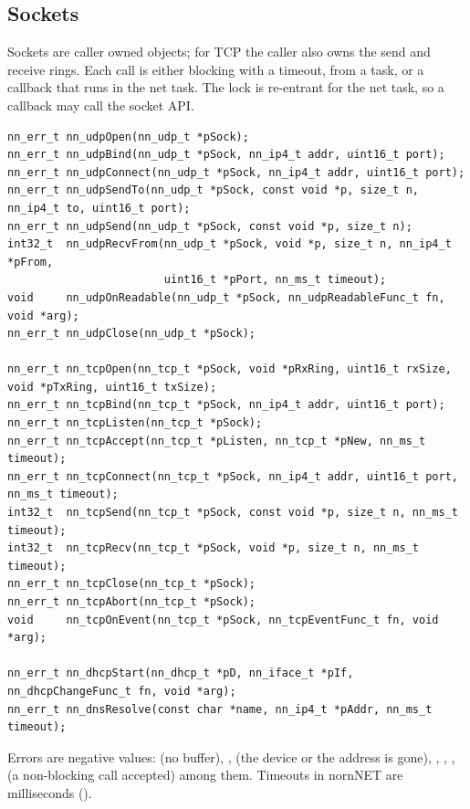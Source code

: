 \subsection{Sockets}

Sockets are caller owned objects; for TCP the caller also owns the send and receive
rings. Each call is either blocking with a timeout, from a task, or a callback that runs
in the net task. The lock is re-entrant for the net task, so a callback may call the
socket API.

\begin{lstlisting}
nn_err_t nn_udpOpen(nn_udp_t *pSock);
nn_err_t nn_udpBind(nn_udp_t *pSock, nn_ip4_t addr, uint16_t port);
nn_err_t nn_udpConnect(nn_udp_t *pSock, nn_ip4_t addr, uint16_t port);
nn_err_t nn_udpSendTo(nn_udp_t *pSock, const void *p, size_t n, nn_ip4_t to, uint16_t port);
nn_err_t nn_udpSend(nn_udp_t *pSock, const void *p, size_t n);
int32_t  nn_udpRecvFrom(nn_udp_t *pSock, void *p, size_t n, nn_ip4_t *pFrom,
                        uint16_t *pPort, nn_ms_t timeout);
void     nn_udpOnReadable(nn_udp_t *pSock, nn_udpReadableFunc_t fn, void *arg);
nn_err_t nn_udpClose(nn_udp_t *pSock);

nn_err_t nn_tcpOpen(nn_tcp_t *pSock, void *pRxRing, uint16_t rxSize, void *pTxRing, uint16_t txSize);
nn_err_t nn_tcpBind(nn_tcp_t *pSock, nn_ip4_t addr, uint16_t port);
nn_err_t nn_tcpListen(nn_tcp_t *pSock);
nn_err_t nn_tcpAccept(nn_tcp_t *pListen, nn_tcp_t *pNew, nn_ms_t timeout);
nn_err_t nn_tcpConnect(nn_tcp_t *pSock, nn_ip4_t addr, uint16_t port, nn_ms_t timeout);
int32_t  nn_tcpSend(nn_tcp_t *pSock, const void *p, size_t n, nn_ms_t timeout);
int32_t  nn_tcpRecv(nn_tcp_t *pSock, void *p, size_t n, nn_ms_t timeout);
nn_err_t nn_tcpClose(nn_tcp_t *pSock);
nn_err_t nn_tcpAbort(nn_tcp_t *pSock);
void     nn_tcpOnEvent(nn_tcp_t *pSock, nn_tcpEventFunc_t fn, void *arg);

nn_err_t nn_dhcpStart(nn_dhcp_t *pD, nn_iface_t *pIf, nn_dhcpChangeFunc_t fn, void *arg);
nn_err_t nn_dnsResolve(const char *name, nn_ip4_t *pAddr, nn_ms_t timeout);
\end{lstlisting}

Errors are negative  values:  (no buffer),
,  (the device or the address is gone),
, , ,
 (a non-blocking call accepted) among them. Timeouts in nornNET
are milliseconds ().

